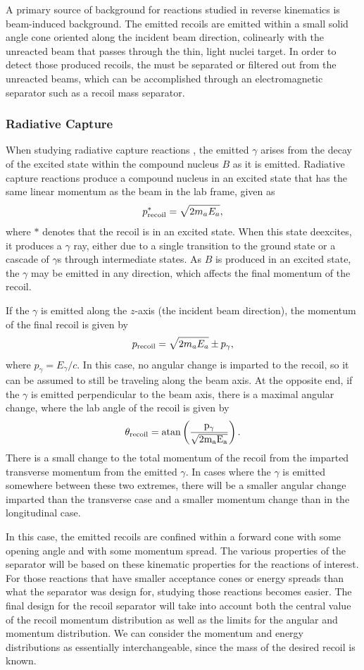 A primary source of background for reactions studied in reverse
kinematics is beam-induced background. The emitted recoils are emitted
within a small solid angle cone oriented along the incident beam
direction, colinearly with the unreacted beam that passes through the
thin, light nuclei target. In order to detect those produced recoils,
the must be separated or filtered out from the unreacted beams, which
can be accomplished through an electromagnetic separator such as a
recoil mass separator.

\subsubsection{Radiative Capture}
When studying radiative capture reactions , the
emitted $\gamma$ arises from the decay of the excited state within the
compound nucleus $B$ as it is emitted. Radiative capture reactions
produce a compound nucleus in an excited state that has the same linear
momentum as the beam in the lab frame, given as
\[
    p^*_{\rm{recoil}} = \sqrt{2m_aE_a},
\]
where $*$ denotes that the recoil is in an excited state. When this
state deexcites, it produces a $\gamma$ ray, either due to a single
transition to the ground state or a cascade of $\gamma$s through
intermediate states. As $B$ is produced in an excited state, the
$\gamma$ may be emitted in any direction, which affects the final
momentum of the recoil.

If the $\gamma$ is emitted along the $z$-axis (the incident beam
direction), the momentum of the final recoil is given by
\[
    p_{\rm{recoil}} = \sqrt{2m_aE_a} \pm p_{\gamma},
\]
where $p_{\gamma} = E_{\gamma}/c$. In this case, no angular change is
imparted to the recoil, so it can be assumed to still be traveling along
the beam axis. At the opposite end, if the $\gamma$ is emitted
perpendicular to the beam axis, there is a maximal angular change, where
the lab angle of the recoil is given by
\[
    \theta_{\rm{recoil}} = \rm{atan}\left(\frac{p_{\gamma}}{\sqrt{2m_aE_a}}\right).
\]
There is a small change to the total momentum of the recoil from the
imparted transverse momentum from the emitted $\gamma$. In cases where
the $\gamma$ is emitted somewhere between these two extremes, there will
be a smaller angular change imparted than the transverse case and a
smaller momentum change than in the longitudinal case.

In this case, the emitted recoils are confined within a forward cone
with some opening angle and with some momentum spread. The various
properties of the separator will be based on these kinematic properties
for the reactions of interest. For those reactions that have smaller
acceptance cones or energy spreads than what the separator was design
for, studying those reactions becomes easier. The final design for the
recoil separator will take into account both the central value of the
recoil momentum distribution as well as the limits for the angular and
momentum distribution. We can consider the momentum and energy
distributions as essentially interchangeable, since the mass of the
desired recoil is known.

